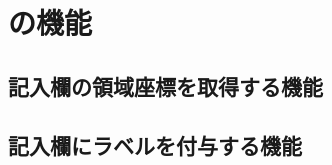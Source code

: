 \chapter{\toolName の機能}\label{cha:Function}



\section{記入欄の領域座標を取得する機能}\label{sec:area_detection}


\section{記入欄にラベルを付与する機能}\label{sec:label_detection}